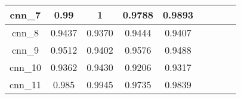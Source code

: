 \begin{table}[p]
\begin{tabular} {|c|c|c|c|c|c|c|c|c| }
        cnn\_7   & 0.99                         & \cellcolor{green!50}1 & 0.9788                     & 0.9893                    \\ \hline
        cnn\_8   & 0.9437                       & 0.9370                & 0.9444                     & 0.9407                    \\ \hline
        cnn\_9   & 0.9512                       & 0.9402                & 0.9576                     & 0.9488                    \\ \hline
        cnn\_10  & 0.9362                       & 0.9430                & 0.9206                     & 0.9317                    \\ \hline
        cnn\_11  & 0.985                        & 0.9945                & 0.9735                     & 0.9839                    \\ \hline
    \end{tabular}
\end{table}








